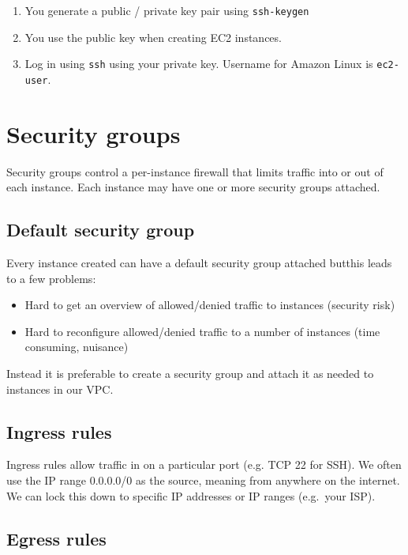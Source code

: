 \documentclass{pgnotes}
\begin{document}
\begin{enumerate}
\item
  You generate a public / private key pair using \texttt{ssh-keygen}
\item
  You use the public key when creating EC2 instances.
\item
  Log in using \texttt{ssh} using your private key.
  Username for Amazon Linux is \texttt{ec2-user}.
\end{enumerate}


\section{Security groups}
\label{security-groups}

Security groups control a per-instance firewall that limits traffic into or out of each instance.
Each instance may have one or more security groups attached.

\subsection{Default security group}

Every instance created can have a default security group attached butthis leads to a few problems:

\begin{itemize}
\item
  Hard to get an overview of allowed/denied traffic to instances
  (security risk)
\item
  Hard to reconfigure allowed/denied traffic to a number of instances
  (time consuming, nuisance)
\end{itemize}

Instead it is preferable to create a security group and attach it as needed to instances in our VPC.

\subsection{Ingress rules}\label{sec:ingress-rules}

Ingress rules allow traffic in on a particular port (e.g. TCP 22 for SSH). 
We often use the IP range 0.0.0.0/0 as the source, meaning from anywhere on the internet.
We can lock this down to specific IP addresses or IP ranges (e.g.~your ISP). 

\subsection{Egress rules}\label{sec:egress-rules}
\end{document}
